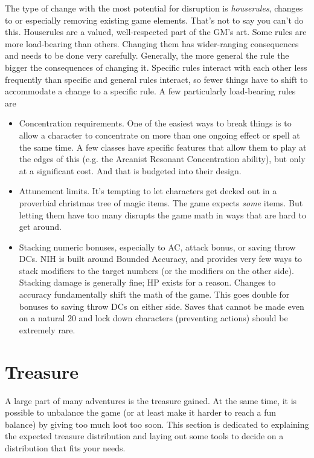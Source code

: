\documentclass[10pt,twoside,openany,bg=none]{dndbook}
\begin{document}
The type of change with the most potential for disruption is \textit{houserules}, changes to or especially removing existing game elements. That's not to say you can't do this. Houserules are a valued, well-respected part of the GM's art. Some rules are more load-bearing than others. Changing them has wider-ranging consequences and needs to be done very carefully. Generally, the more general the rule the bigger the consequences of changing it. Specific rules interact with each other less frequently than specific and general rules interact, so fewer things have to shift to accommodate a change to a specific rule. A few particularly load-bearing rules are
\begin{itemize}
    \item Concentration requirements. One of the easiest ways to break things is to allow a character to concentrate on more than one ongoing effect or spell at the same time. A few classes have specific features that allow them to play at the edges of this (e.g. the Arcanist Resonant Concentration ability), but only at a significant cost. And that is budgeted into their design.
    \item Attunement limits. It's tempting to let characters get decked out in a proverbial christmas tree of magic items. The game expects \textit{some} items. But letting them have too many disrupts the game math in ways that are hard to get around.
    \item Stacking numeric bonuses, especially to AC, attack bonus, or saving throw DCs. NIH is built around Bounded Accuracy, and provides very few ways to stack modifiers to the target numbers (or the modifiers on the other side). Stacking damage is generally fine; HP exists for a reason. Changes to accuracy fundamentally shift the math of the game. This goes double for bonuses to saving throw DCs on either side. Saves that cannot be made even on a natural 20 and lock down characters (preventing actions) should be extremely rare.
\end{itemize}

\section{Treasure}\label{sec:treasure}
A large part of many adventures is the treasure gained. At the same time, it is possible to unbalance the game (or at least make it harder to reach a fun balance) by giving too much loot too soon. This section is dedicated to explaining the expected treasure distribution and laying out some tools to decide on a distribution that fits your needs.
\end{document}
